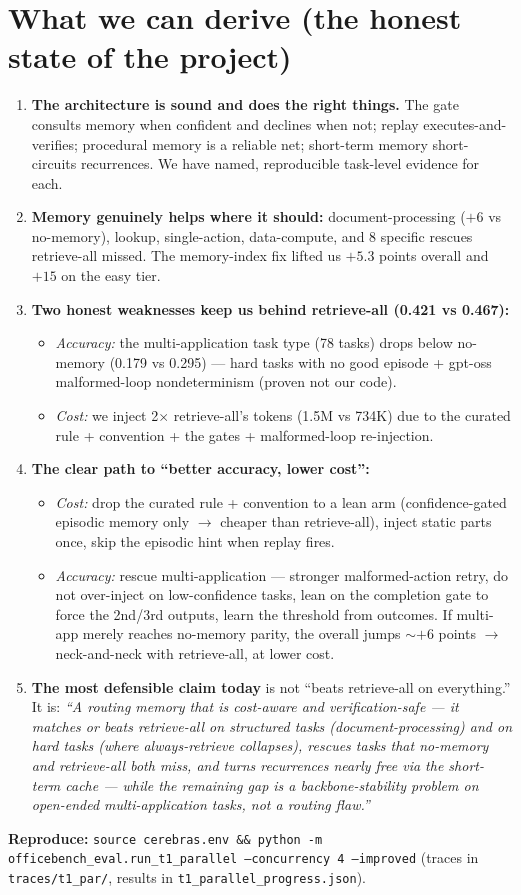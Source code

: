 \documentclass[11pt]{article}
\newcommand{\code}[1]{\texttt{#1}}
\begin{document}
\section{What we can derive (the honest state of the project)}
\begin{enumerate}[leftmargin=1.5em,itemsep=3pt]
\item \textbf{The architecture is sound and does the right things.} The gate consults memory when
confident and declines when not; replay executes-and-verifies; procedural memory is a reliable net;
short-term memory short-circuits recurrences. We have named, reproducible task-level evidence for each.
\item \textbf{Memory genuinely helps where it should:} document-processing ($+6$ vs no-memory), lookup,
single-action, data-compute, and 8 specific rescues retrieve-all missed. The memory-index fix lifted us
$+5.3$ points overall and $+15$ on the easy tier.
\item \textbf{Two honest weaknesses keep us behind retrieve-all (0.421 vs 0.467):}
  \begin{itemize}[leftmargin=1.2em,itemsep=0pt]
  \item \emph{Accuracy:} the multi-application task type (78 tasks) drops below no-memory (0.179 vs 0.295)
  --- hard tasks with no good episode + gpt-oss malformed-loop nondeterminism (proven not our code).
  \item \emph{Cost:} we inject 2$\times$ retrieve-all's tokens (1.5M vs 734K) due to the curated rule +
  convention + the gates + malformed-loop re-injection.
  \end{itemize}
\item \textbf{The clear path to ``better accuracy, lower cost'':}
  \begin{itemize}[leftmargin=1.2em,itemsep=0pt]
  \item \emph{Cost:} drop the curated rule + convention to a lean arm (confidence-gated episodic memory
  only $\to$ cheaper than retrieve-all), inject static parts once, skip the episodic hint when replay fires.
  \item \emph{Accuracy:} rescue multi-application --- stronger malformed-action retry, do not over-inject
  on low-confidence tasks, lean on the completion gate to force the 2nd/3rd outputs, learn the threshold
  from outcomes. If multi-app merely reaches no-memory parity, the overall jumps $\sim+6$ points $\to$
  neck-and-neck with retrieve-all, at lower cost.
  \end{itemize}
\item \textbf{The most defensible claim today} is not ``beats retrieve-all on everything.'' It is:
\emph{``A routing memory that is cost-aware and verification-safe --- it matches or beats retrieve-all on
structured tasks (document-processing) and on hard tasks (where always-retrieve collapses), rescues tasks
that no-memory and retrieve-all both miss, and turns recurrences nearly free via the short-term cache ---
while the remaining gap is a backbone-stability problem on open-ended multi-application tasks, not a
routing flaw.''}
\end{enumerate}

\vspace{6pt}
\noindent\textbf{Reproduce:} \code{source cerebras.env \&\& python -m officebench\_eval.run\_t1\_parallel
--concurrency 4 --improved} \quad(traces in \code{traces/t1\_par/}, results in \code{t1\_parallel\_progress.json}).
\end{document}
